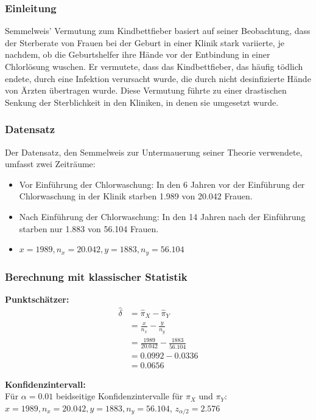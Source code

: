 \documentclass[a4paper,12pt]{article}
\begin{document}
\subsubsection{Einleitung}
Semmelweis' Vermutung zum Kindbettfieber basiert auf seiner Beobachtung, dass der Sterberate von Frauen bei der Geburt 
in einer Klinik stark variierte, je nachdem, ob die Geburtshelfer ihre Hände vor der Entbindung in einer Chlorlösung wuschen. 
Er vermutete, dass das Kindbettfieber, das häufig tödlich endete, durch eine Infektion verursacht wurde, 
die durch nicht desinfizierte Hände von Ärzten übertragen wurde. Diese Vermutung führte zu einer 
drastischen Senkung der Sterblichkeit in den Kliniken, in denen sie umgesetzt wurde.
\parencite[3]{StatistikKlassischOderBayes}

\subsubsection{Datensatz}
Der Datensatz, den Semmelweis zur Untermauerung seiner Theorie verwendete, umfasst zwei Zeiträume: 
\begin{itemize}
    \item Vor Einführung der Chlorwaschung: In den 6 Jahren vor der Einführung der Chlorwaschung in der Klinik starben 1.989 von 20.042 Frauen.
    \item Nach Einführung der Chlorwaschung: In den 14 Jahren nach der Einführung starben nur 1.883 von 56.104 Frauen.
    \item $x = 1989, n_x = 20.042, y = 1883, n_y = 56.104$
\end{itemize}

\subsubsection{Berechnung mit klassischer Statistik}
\textbf{Punktschätzer:} 
\begin{align}
  \hat{\delta} &= \hat{\pi}_X - \hat{\pi}_Y \\
  &= \frac{x}{n_x} - \frac{y}{n_y} \\
  &= \frac{1989}{20.042} - \frac{1883}{56.104} \\
  &= 0.0992 - 0.0336 \\
  &= 0.0656
\end{align}

\textbf{Konfidenzintervall:} \\
Für $\alpha = 0.01$ beidseitige Konfidenzintervalle für $\pi_X$ und $\pi_Y$: \\
$x = 1989, n_x = 20.042, y = 1883, n_y = 56.104$, $z_{\alpha/2} = 2.576$ \\
\end{document}

